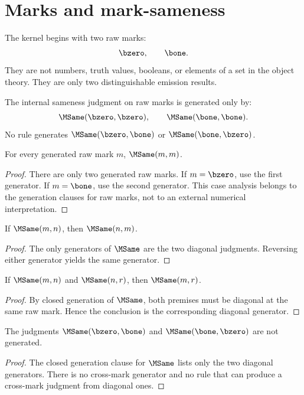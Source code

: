 \section{Marks and mark-sameness}

\begin{definition}
The kernel begins with two raw marks:
$$
\bzero,\qquad \bone.
$$
They are not numbers, truth values, booleans, or elements of a set in the object theory.  They are only two distinguishable emission results.
\end{definition}

\begin{definition}
The internal sameness judgment on raw marks is generated only by:
$$
\MSame(\bzero,\bzero),
\qquad
\MSame(\bone,\bone).
$$
No rule generates \(\MSame(\bzero,\bone)\) or \(\MSame(\bone,\bzero)\).
\end{definition}

\begin{lemma}
For every generated raw mark \(m\), \(\MSame(m,m)\).
\end{lemma}
\begin{proof}
There are only two generated raw marks.  If \(m=\bzero\), use the first generator.  If \(m=\bone\), use the second generator.  This case analysis belongs to the generation clauses for raw marks, not to an external numerical interpretation.
\end{proof}

\begin{lemma}
If \(\MSame(m,n)\), then \(\MSame(n,m)\).
\end{lemma}
\begin{proof}
The only generators of \(\MSame\) are the two diagonal judgments.  Reversing either generator yields the same generator.
\end{proof}

\begin{lemma}
If \(\MSame(m,n)\) and \(\MSame(n,r)\), then \(\MSame(m,r)\).
\end{lemma}
\begin{proof}
By closed generation of \(\MSame\), both premises must be diagonal at the same raw mark.  Hence the conclusion is the corresponding diagonal generator.
\end{proof}

\begin{theorem}
The judgments \(\MSame(\bzero,\bone)\) and \(\MSame(\bone,\bzero)\) are not generated.
\end{theorem}
\begin{proof}
The closed generation clause for \(\MSame\) lists only the two diagonal generators.  There is no cross-mark generator and no rule that can produce a cross-mark judgment from diagonal ones.
\end{proof}
